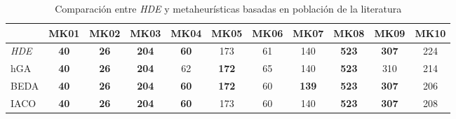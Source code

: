 \begin{table}[H]
\scriptsize
  \centering
  \caption{Comparación entre \textit{HDE} y metaheurísticas basadas en población de la literatura}
    \begin{tabular}{|l|c|c|c|c|c|c|c|c|c|c|}
    \hline
    \multicolumn{1}{|r}{} & \multicolumn{1}{|l}{MK01} & \multicolumn{1}{|l}{MK02} & \multicolumn{1}{|l}{MK03} & \multicolumn{1}{|l}{MK04} & \multicolumn{1}{|l}{MK05} & \multicolumn{1}{|l}{MK06} & \multicolumn{1}{|l}{MK07} & \multicolumn{1}{|l}{MK08} & \multicolumn{1}{|l}{MK09} & \multicolumn{1}{|l|}{MK10} \\
    \hline
    \textit{HDE}   & \textbf{40} & \textbf{26} & \textbf{204} & \textbf{60} & 173   & 61    & 140   & \textbf{523} & \textbf{307} & 224 \\
    hGA   & \textbf{40} & \textbf{26} & \textbf{204} & 62    & \textbf{172} & 65    & 140   & \textbf{523} & 310   & 214 \\
    BEDA  & \textbf{40} & \textbf{26} & \textbf{204} & \textbf{60} & \textbf{172} & 60    & \textbf{139} & \textbf{523} & \textbf{307} & 206 \\
    IACO  & \textbf{40} & \textbf{26} & \textbf{204} & \textbf{60} & 173   & 60    & 140   & \textbf{523} & \textbf{307} & 208 \\
\hline
    \end{tabular}%
  \label{tab:comparison}%
\end{table}%
